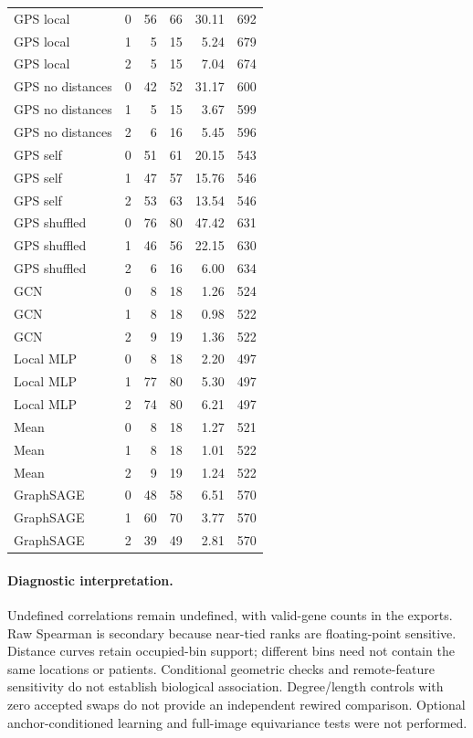 \begin{longtable}{@{}lrrrrr@{}}
GPS local & 0 & 56 & 66 & 30.11 & 692 \\
GPS local & 1 & 5 & 15 & 5.24 & 679 \\
GPS local & 2 & 5 & 15 & 7.04 & 674 \\
GPS no distances & 0 & 42 & 52 & 31.17 & 600 \\
GPS no distances & 1 & 5 & 15 & 3.67 & 599 \\
GPS no distances & 2 & 6 & 16 & 5.45 & 596 \\
GPS self & 0 & 51 & 61 & 20.15 & 543 \\
GPS self & 1 & 47 & 57 & 15.76 & 546 \\
GPS self & 2 & 53 & 63 & 13.54 & 546 \\
GPS shuffled & 0 & 76 & 80 & 47.42 & 631 \\
GPS shuffled & 1 & 46 & 56 & 22.15 & 630 \\
GPS shuffled & 2 & 6 & 16 & 6.00 & 634 \\
GCN & 0 & 8 & 18 & 1.26 & 524 \\
GCN & 1 & 8 & 18 & 0.98 & 522 \\
GCN & 2 & 9 & 19 & 1.36 & 522 \\
Local MLP & 0 & 8 & 18 & 2.20 & 497 \\
Local MLP & 1 & 77 & 80 & 5.30 & 497 \\
Local MLP & 2 & 74 & 80 & 6.21 & 497 \\
Mean & 0 & 8 & 18 & 1.27 & 521 \\
Mean & 1 & 8 & 18 & 1.01 & 522 \\
Mean & 2 & 9 & 19 & 1.24 & 522 \\
GraphSAGE & 0 & 48 & 58 & 6.51 & 570 \\
GraphSAGE & 1 & 60 & 70 & 3.77 & 570 \\
GraphSAGE & 2 & 39 & 49 & 2.81 & 570 \\\bottomrule\end{longtable}

\paragraph{Diagnostic interpretation.} Undefined correlations remain undefined, with valid-gene counts in the exports. Raw Spearman is secondary because near-tied ranks are floating-point sensitive. Distance curves retain occupied-bin support; different bins need not contain the same locations or patients. Conditional geometric checks and remote-feature sensitivity do not establish biological association. Degree/length controls with zero accepted swaps do not provide an independent rewired comparison. Optional anchor-conditioned learning and full-image equivariance tests were not performed.

